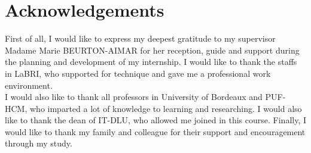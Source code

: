 \chapter*{Acknowledgements}
\thispagestyle{empty}
\indent First of all, I would like to express my deepest gratitude to my supervisor Madame Marie BEURTON-AIMAR for her reception, guide and support during the planning and development of my internship. I would like to thank the staffs in LaBRI, who supported for technique and gave me a professional work environment. 
\\[0.3cm]
I would also like to thank all professors in University of Bordeaux and PUF-HCM, who imparted a lot of knowledge to learning and researching. I would also like to thank the dean of IT-DLU, who allowed me joined in this course. 
Finally, I would like to thank my family and colleague for their support and encouragement through my study.
\clearpage